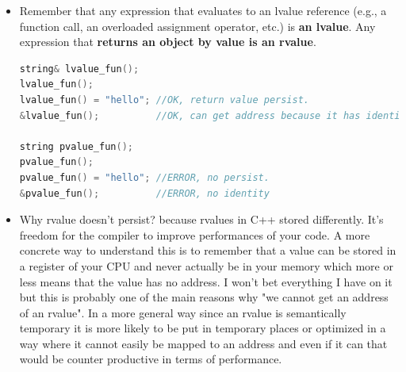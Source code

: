 \documentclass[a4paper,11pt,twoside]{book}
\begin{document}
\begin{itemize}
	\item Remember that any expression that evaluates to an lvalue reference (e.g., a function call, an overloaded assignment operator, etc.) is \textbf{an lvalue}. Any expression that \textbf{returns an object by value is an rvalue}.

\begin{lstlisting}[frame=single, language=c++, mathescape=true]
string& lvalue_fun();
lvalue_fun(); 
lvalue_fun() = "hello"; //OK, return value persist.
&lvalue_fun();          //OK, can get address because it has identity

string pvalue_fun();
pvalue_fun(); 
pvalue_fun() = "hello"; //ERROR, no persist.
&pvalue_fun();          //ERROR, no identity 	
\end{lstlisting}

	\item Why rvalue doesn't persist? because rvalues in C++ stored differently. It's freedom for the compiler to improve performances of your code. A more concrete way to understand this is to remember that a value can be stored in a register of your CPU and never actually be in your memory which more or less means that the value has no address. I won't bet everything I have on it but this is probably one of the main reasons why "we cannot get an address of an rvalue". In a more general way since an rvalue is semantically temporary it is more likely to be put in temporary places or optimized in a way where it cannot easily be mapped to an address and even if it can that would be counter productive in terms of performance.
\end{itemize}
\end{document}
